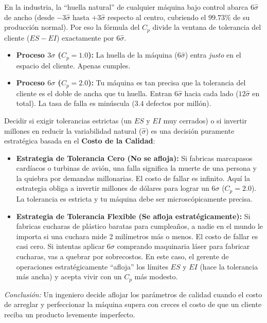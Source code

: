 \begin{tcolorbox}[colback=yellow!5!white,colframe=yellow!75!black,title={Nota Teórica: La conexión con el $3\sigma$ y $6\sigma$}]
En la industria, la ``huella natural'' de cualquier máquina bajo control abarca $6\hat{\sigma}$ de ancho (desde $-3\hat{\sigma}$ hasta $+3\hat{\sigma}$ respecto al centro, cubriendo el $99.73\%$ de su producción normal). Por eso la fórmula del $C_p$ divide la ventana de tolerancia del cliente ($ES - EI$) exactamente por $6\hat{\sigma}$.
\begin{itemize}
    \item \textbf{Proceso $3\sigma$ ($C_p = 1.0$):} La huella de la máquina ($6\hat{\sigma}$) entra \textit{justo} en el espacio del cliente. Apenas cumples.
    \item \textbf{Proceso $6\sigma$ ($C_p = 2.0$):} Tu máquina es tan precisa que la tolerancia del cliente es el doble de ancha que tu huella. Entran $6\hat{\sigma}$ hacia cada lado ($12\hat{\sigma}$ en total). La tasa de falla es minúscula ($3.4$ defectos por millón).
\end{itemize}
\end{tcolorbox}

\begin{tcolorbox}[colback=purple!5!white,colframe=purple!75!black,title={Perspectiva Gerencial: ¿Es siempre necesario el $6\sigma$?}]
Decidir si exigir tolerancias estrictas (un $ES$ y $EI$ muy cerrados) o si invertir millones en reducir la variabilidad natural ($\hat{\sigma}$) es una decisión puramente estratégica basada en el \textbf{Costo de la Calidad}:
\begin{itemize}
    \item \textbf{Estrategia de Tolerancia Cero (No se afloja):} Si fabricas marcapasos cardíacos o turbinas de avión, una falla significa la muerte de una persona y la quiebra por demandas millonarias. El costo de fallar es infinito. Aquí la estrategia obliga a invertir millones de dólares para lograr un $6\sigma$ ($C_p = 2.0$). La tolerancia es estricta y tu máquina debe ser microscópicamente precisa.
    \item \textbf{Estrategia de Tolerancia Flexible (Se afloja estratégicamente):} Si fabricas cucharas de plástico baratas para cumpleaños, a nadie en el mundo le importa si una cuchara mide 2 milímetros más o menos. El costo de fallar es casi cero. Si intentas aplicar $6\sigma$ comprando maquinaria láser para fabricar cucharas, vas a quebrar por sobrecostos. En este caso, el gerente de operaciones estratégicamente ``afloja'' los límites $ES$ y $EI$ (hace la tolerancia más ancha) y acepta vivir con un $C_p$ más modesto.
\end{itemize}
\textit{Conclusión:} Un ingeniero decide aflojar los parámetros de calidad cuando el costo de arreglar y perfeccionar la máquina supera con creces el costo de que un cliente reciba un producto levemente imperfecto.
\end{tcolorbox}

